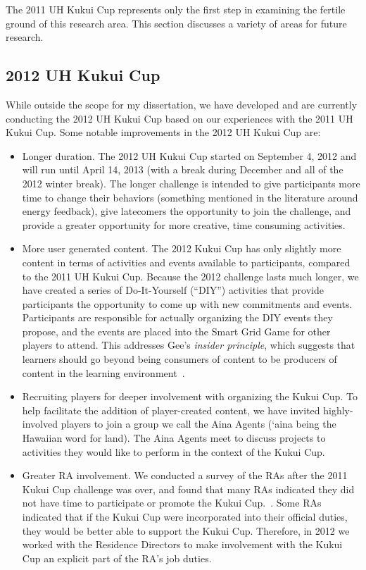 The 2011 UH Kukui Cup represents only the first step in examining the fertile ground of this research area. This section discusses a variety of areas for future research.

\subsection{2012 UH Kukui Cup}
\label{sec:2012-kukui-cup}

While outside the scope for my dissertation, we have developed and are currently conducting the 2012 UH Kukui Cup based on our experiences with the 2011 UH Kukui Cup. Some notable improvements in the 2012 UH Kukui Cup are:

\begin{itemize}
	\item Longer duration. The 2012 UH Kukui Cup started on September 4, 2012 and will run until April 14, 2013 (with a break during December and all of the 2012 winter break). The longer challenge is intended to give participants more time to change their behaviors (something mentioned in the literature around energy feedback), give latecomers the opportunity to join the challenge, and provide a greater opportunity for more creative, time consuming activities.
	\item More user generated content. The 2012 Kukui Cup has only slightly more content in terms of activities and events available to participants, compared to the 2011 UH Kukui Cup. Because the 2012 challenge lasts much longer, we have created a series of Do-It-Yourself (``DIY'') activities that provide participants the opportunity to come up with new commitments and events. Participants are responsible for actually organizing the DIY events they propose, and the events are placed into the Smart Grid Game for other players to attend. This addresses Gee's \emph{insider principle}, which suggests that learners should go beyond being consumers of content to be producers of content in the learning environment~\cite[p. 212]{Gee2007}.
	\item Recruiting players for deeper involvement with organizing the Kukui Cup. To help facilitate the addition of player-created content, we have invited highly-involved players to join a group we call the Aina Agents (`aina being the Hawaiian word for land). The Aina Agents meet to discuss projects to activities they would like to perform in the context of the Kukui Cup.
	\item Greater RA involvement. We conducted a survey of the RAs after the 2011 Kukui Cup challenge was over, and found that many RAs indicated they did not have time to participate or promote the Kukui Cup.~\cite{csdl2-11-08}. Some RAs indicated that if the Kukui Cup were incorporated into their official duties, they would be better able to support the Kukui Cup. Therefore, in 2012 we worked with the Residence Directors to make involvement with the Kukui Cup an explicit part of the RA's job duties.

\end{itemize}
